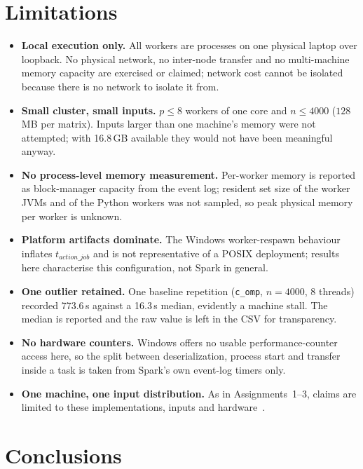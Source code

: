 \documentclass[11pt,a4paper]{article}
\begin{document}
\section{Limitations}

\begin{itemize}
  \item \textbf{Local execution only.} All workers are processes on one
        physical laptop over loopback. No physical network, no
        inter-node transfer and no multi-machine memory capacity are
        exercised or claimed; network cost cannot be isolated because
        there is no network to isolate it from.
  \item \textbf{Small cluster, small inputs.} $p \le 8$ workers of one
        core and $n \le 4000$ ($128$\,MB per matrix). Inputs larger than
        one machine's memory were not attempted; with 16.8\,GB available
        they would not have been meaningful anyway.
  \item \textbf{No process-level memory measurement.} Per-worker memory
        is reported as block-manager capacity from the event log;
        resident set size of the worker JVMs and of the Python workers
        was not sampled, so peak physical memory per worker is unknown.
  \item \textbf{Platform artifacts dominate.} The Windows
        worker-respawn behaviour inflates $t_{action\_job}$ and is not
        representative of a POSIX deployment; results here characterise
        this configuration, not Spark in general.
  \item \textbf{One outlier retained.} One baseline repetition
        (\texttt{c\_omp}, $n=4000$, 8 threads) recorded 773.6\,s against
        a 16.3\,s median, evidently a machine stall. The median is
        reported and the raw value is left in the CSV for transparency.
  \item \textbf{No hardware counters.} Windows offers no usable
        performance-counter access here, so the split between
        deserialization, process start and transfer inside a task is
        taken from Spark's own event-log timers only.
  \item \textbf{One machine, one input distribution.} As in
        Assignments~1--3, claims are limited to these implementations,
        inputs and hardware~\cite{fleming1986,mytkowicz2009}.
\end{itemize}

\section{Conclusions}
\end{document}
